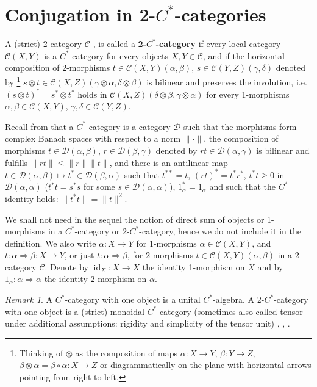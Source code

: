 \documentclass[11pt,a4paper]{article}
\makeatletter
\newcommand{\C}{\mathcal{C}}
\newcommand{\D}{\mathcal{D}}
\DeclareMathOperator{\id}{id}
\DeclareRobustCommand{\ie}{i.e.\@\xspace}
\DeclareRobustCommand{\Ch}{Ch.\@\xspace}
\newcommand{\Cstar}{$C^\ast$\@\xspace}
\theoremstyle{plain}
\theoremstyle{definition}
\theoremstyle{remark}
\newtheorem{rmk}[thm]{Remark}
\numberwithin{equation}{section}%
\makeatother
\begin{document}
\section{Conjugation in 2-\Cstar-categories}\label{sec:conjin2Cstarcats}


A (strict) 2-category $\C$ \cite[\Ch XII]{Mac98}, \cite{JhYaBook} is called a \textbf{2-\Cstar-category} \cite{LoRo97} if every local category $\C(X,Y)$ is a \Cstar-category for every objects $X,Y\in\C$, and if the horizontal composition of 2-morphisms $t\in\C(X,Y)(\alpha,\beta)$, $s\in\C(Y,Z)(\gamma,\delta)$ denoted by
\footnote{Thinking of $\otimes$ as the composition of maps $\alpha:X\to Y$, $\beta:Y\to Z$, $\beta\otimes\alpha = \beta \circ \alpha: X \to Z$ or diagrammatically on the plane with horizontal arrows pointing from right to left.} 
$s\otimes t\in\C(X,Z)(\gamma\otimes\alpha,\delta\otimes\beta)$ is bilinear and preserves the involution, \ie $(s\otimes t)^* = s^* \otimes t^*$ holds in $\C(X,Z)(\delta\otimes\beta,\gamma\otimes\alpha)$ for every 1-morphisms $\alpha,\beta\in\C(X,Y)$, $\gamma,\delta\in\C(Y,Z)$. 

Recall from \cite{GLR85} that a \Cstar-category is a category $\D$ such that the morphisms form complex Banach spaces with respect to a norm $\|\cdot\|$, the composition of morphisms $t\in\D(\alpha,\beta)$, $r\in\D(\beta,\gamma)$ denoted by $r t \in \D(\alpha,\gamma)$ is bilinear and fulfills $\|rt\| \leq \|r\|\|t\|$, and there is an antilinear map $t\in\D(\alpha,\beta) \mapsto t^*\in\D(\beta,\alpha)$ such that $t^{**} = t$, $(rt)^* = t^*r^*$, $t^*t \geq 0$ in $\D(\alpha,\alpha)$ ($t^*t = s^*s$ for some $s\in\D(\alpha,\alpha)$), $1_\alpha^* = 1_\alpha$ and such that the \Cstar identity holds: $\|t^*t\| = \|t\|^2$.

We shall not need in the sequel the notion of direct sum of objects or 1-morphisms in a \Cstar-category or 2-\Cstar-category, hence we do not include it in the definition.
We also write $\alpha:X\to Y$ for 1-morphisms $\alpha\in\C(X,Y)$, and $t:\alpha\Rightarrow\beta:X\to Y$, or just $t:\alpha\Rightarrow\beta$, for 2-morphisms $t\in\C(X,Y)(\alpha,\beta)$ in a 2-category $\C$. Denote by $\id_X:X\to X$ the identity 1-morphism on $X$ and by $1_\alpha:\alpha\Rightarrow\alpha$ the identity 2-morphism on $\alpha$.

\begin{rmk}
A \Cstar-category with one object is a unital \Cstar-algebra. A 2-\Cstar-category with one object is a (strict) monoidal \Cstar-category (sometimes also called tensor under additional assumptions: rigidity and simplicity of the tensor unit) \cite{LoRo97}, \cite{DoRo89}, \cite{EGNO15}.
\end{rmk} 
\end{document}
